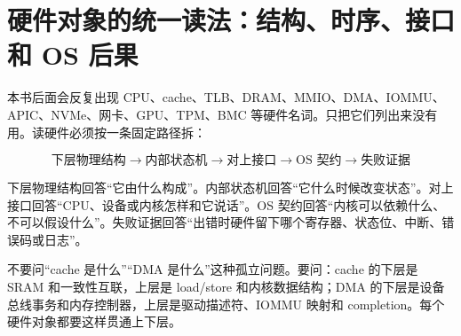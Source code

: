 \section{硬件对象的统一读法：结构、时序、接口和 OS 后果}

本书后面会反复出现 CPU、cache、TLB、DRAM、MMIO、DMA、IOMMU、APIC、NVMe、网卡、GPU、TPM、BMC 等硬件名词。只把它们列出来没有用。读硬件必须按一条固定路径拆：

\[
\text{下层物理结构}
\rightarrow
\text{内部状态机}
\rightarrow
\text{对上接口}
\rightarrow
\text{OS 契约}
\rightarrow
\text{失败证据}
\]

下层物理结构回答“它由什么构成”。内部状态机回答“它什么时候改变状态”。对上接口回答“CPU、设备或内核怎样和它说话”。OS 契约回答“内核可以依赖什么、不可以假设什么”。失败证据回答“出错时硬件留下哪个寄存器、状态位、中断、错误码或日志”。

\begin{keyidea}
不要问“cache 是什么”“DMA 是什么”这种孤立问题。要问：cache 的下层是 SRAM 和一致性互联，上层是 load/store 和内核数据结构；DMA 的下层是设备总线事务和内存控制器，上层是驱动描述符、IOMMU 映射和 completion。每个硬件对象都要这样贯通上下层。
\end{keyidea}

